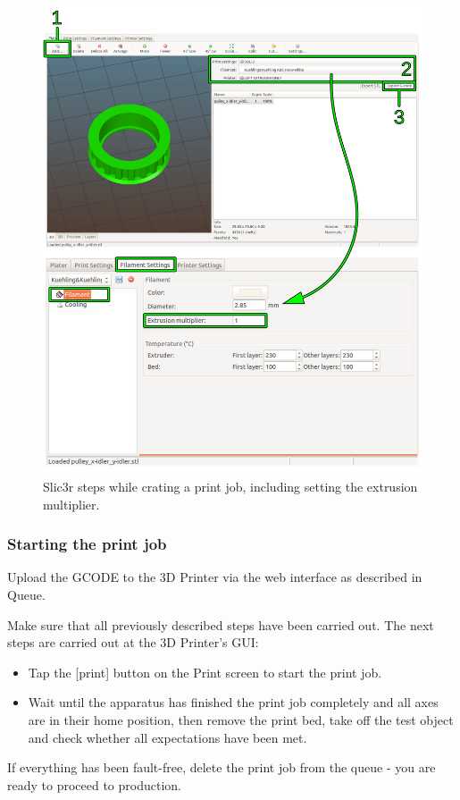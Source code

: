 \begin{figure}[H]
  \centering
  \includegraphics[width=.7\linewidth]{./img/slic3r_start_plater_select.png}
  \caption{Slic3r steps while crating a print job, including setting the extrusion 
           multiplier.}
\end{figure}


\subsubsection{Starting the print job}

Upload the GCODE to the 3D Printer via the web interface as described in Queue.

Make sure that all previously described steps have been carried out.
The next steps are carried out at the 3D Printer's GUI:
\begin{itemize}
  \item Tap the [print] button on the Print screen to start the print job.
  \item Wait until the apparatus has finished the print job completely and all axes are 
        in their home position, then remove the print bed, take off the test object and check whether all expectations have been met.
\end{itemize}

If everything has been fault-free, delete the print job from the queue - you are ready to proceed to production.

